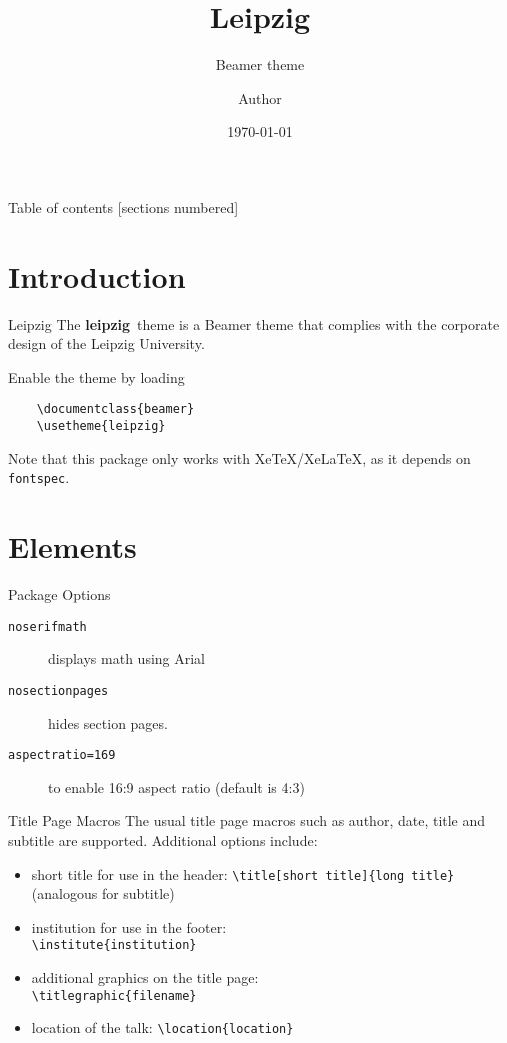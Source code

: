 \documentclass[noserifmath,aspectratio=169]{beamer}
\title[Leipzig]{Leipzig}
\subtitle[Beamer Theme]{Beamer theme}
\author{Author}
\institute{Institute}
\date{\today}
\newcommand{\themename}{\textbf{leipzig}~}
\begin{document}
\maketitle

\begin{frame}{Table of contents}
  [sections numbered]
  \tableofcontents[hideallsubsections]
\end{frame}

\section{Introduction}

\begin{frame}[fragile]{Leipzig}
The \themename theme is a Beamer theme that complies with the corporate design of the Leipzig University.

Enable the theme by loading
\begin{verbatim}
    \documentclass{beamer}
    \usetheme{leipzig}
\end{verbatim}

Note that this package only works with XeTeX/XeLaTeX, as it depends on \texttt{fontspec}.
\end{frame}

\section{Elements}
\begin{frame}[fragile]{Package Options}
\begin{description}
\item[\texttt{noserifmath}] displays math using Arial
\item[\texttt{nosectionpages}] hides section pages.
\item[\texttt{aspectratio=169}] to enable 16:9 aspect ratio (default is 4:3)
\end{description}
\end{frame}

\begin{frame}[fragile]{Title Page Macros}
The usual title page macros such as author, date, title and subtitle are supported.
Additional options include:
\begin{itemize}
\item short title for use in the header: \verb+\title[short title]{long title}+ (analogous for subtitle)
\item institution for use in the footer: \\ \verb+\institute{institution}+
\item additional graphics on the title page: \\ \verb+\titlegraphic{filename}+
\item location of the talk: \verb+\location{location}+
\end{itemize}
\end{frame}
\end{document}
